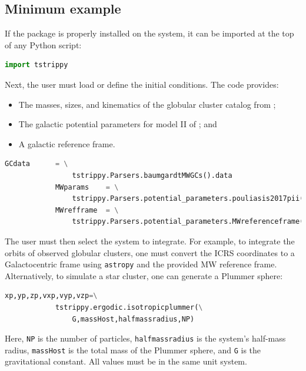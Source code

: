     \subsection{Minimum example}
        If the package is properly installed on the system, it can be imported at the top of any Python script:
        \small
        \begin{lstlisting}[language=python]
            import tstrippy    
        \end{lstlisting}
        \normalsize
        Next, the user must load or define the initial conditions. The code provides:
        \begin{itemize}
            \item The masses, sizes, and kinematics of the globular cluster catalog from \citet{2018MNRAS.478.1520B};
            \item The galactic potential parameters for model II of \citet{2017A&A...598A..66P}; and
            \item A galactic reference frame.
        \end{itemize}

        \small
        \begin{lstlisting}[language=python]
            GCdata      = \
                tstrippy.Parsers.baumgardtMWGCs().data
            MWparams    = \
                tstrippy.Parsers.potential_parameters.pouliasis2017pii()
            MWrefframe  = \
                tstrippy.Parsers.potential_parameters.MWreferenceframe()
        \end{lstlisting}
        \normalsize
        The user must then select the system to integrate. For example, to integrate the orbits of observed globular clusters, one must convert the ICRS coordinates to a Galactocentric frame using \texttt{astropy} and the provided MW reference frame. Alternatively, to simulate a star cluster, one can generate a Plummer sphere:
        \small
        \begin{lstlisting}[language=python]
            xp,yp,zp,vxp,vyp,vzp=\
            tstrippy.ergodic.isotropicplummer(\
                G,massHost,halfmassradius,NP)
        \end{lstlisting}
        Here, \texttt{NP} is the number of particles, \texttt{halfmassradius} is the system's half-mass radius, \texttt{massHost} is the total mass of the Plummer sphere, and \texttt{G} is the gravitational constant. All values must be in the same unit system.

